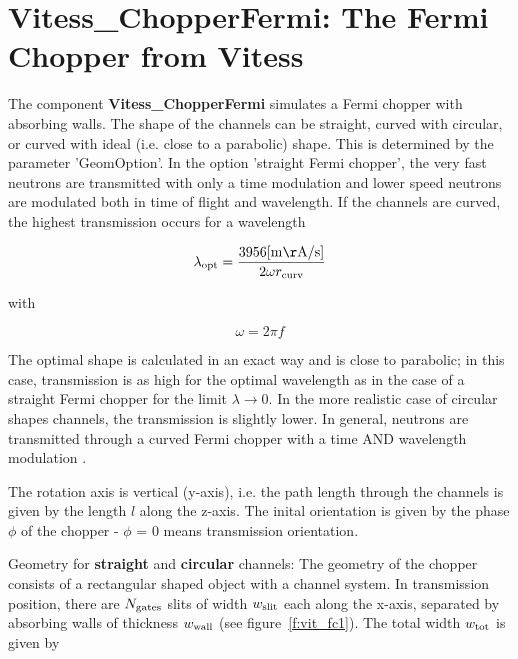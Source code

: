 
\section{Vitess\_ChopperFermi: The Fermi Chopper from Vitess}
\label{s:vit_fc}



The component {\bf Vitess\_ChopperFermi} simulates a Fermi chopper with absorbing walls.
The shape of the channels can be straight, curved with circular, or curved with ideal
(i.e. close to a parabolic) shape.
This is determined by the parameter 'GeomOption'. In the option 'straight Fermi
chopper', the very fast neutrons are transmitted with only a time modulation and lower
speed neutrons are modulated both in time of flight and wavelength.
If the channels are curved, the highest transmission occurs for a wavelength

\begin{equation}
\lambda_{\rm opt} = \frac{3956 {\rm [m\AA/s]}}{2 \omega r_{\rm curv}}
\end{equation}

with

\begin{equation}
\omega = 2 \pi f
\end{equation}

The optimal shape is calculated in an exact way and is close to parabolic; in this
case, transmission is as high for the optimal wavelength as in the case of a straight
Fermi chopper for the limit $\lambda \rightarrow 0$.
In the more realistic case of circular shapes channels, the transmission is slightly
lower. In general, neutrons are transmitted through a curved Fermi chopper with a time
AND wavelength modulation .

The rotation axis is vertical (y-axis), i.e. the path length through the channels is
given by the length $l$ along the z-axis. The inital orientation is given by the phase
$\phi$ of the chopper - $\phi$ = 0 means transmission orientation.

Geometry for {\bf straight} and {\bf circular} channels:
The geometry of the chopper consists of a rectangular shaped object with a channel
system. In transmission position, there are $N_{\rm gates}$ slits of width $w_{\rm slit}$
each along the x-axis, separated by absorbing walls of thickness $w_{\rm wall}$
(see figure~\ref{f:vit_fc1}). The total width $w_{\rm tot}$ is given by

